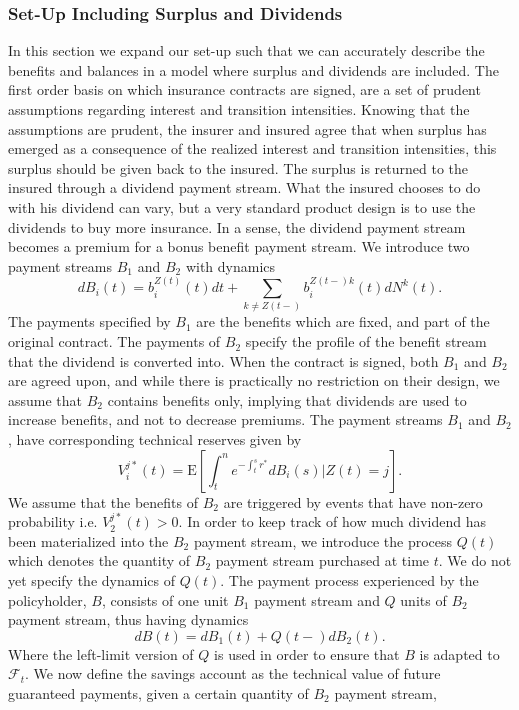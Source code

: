 \documentclass[12pt]{article}
\newcommand{\E}{\text{E}}
\theoremstyle{my_thm}
\begin{document}
\subsubsection{Set-Up Including Surplus and Dividends}
In this section we expand our set-up such that we can accurately describe the benefits and balances in a model where surplus and dividends are included. The first order basis on which insurance contracts are signed, are a set of prudent assumptions regarding interest and transition intensities. Knowing that the assumptions are prudent, the insurer and insured agree that when surplus has emerged as a consequence of the realized interest and transition intensities, this surplus should be given back to the insured. The surplus is returned to the insured through a dividend payment stream. What the insured chooses to do with his dividend can vary, but a very standard product design is to use the dividends to buy more insurance. In a sense, the dividend payment stream becomes a premium for a bonus benefit payment stream. We introduce two payment streams $B_1$ and $B_2$ with dynamics
$$
dB_i(t)=b_i^{Z(t)}(t) dt +\sum_{k \neq Z(t-)} b_i^{Z(t-)k}(t)dN^k(t).
$$
The payments specified by $B_1$ are the benefits which are fixed, and part of the original contract. The payments of $B_2$ specify the profile of the benefit stream that the dividend is converted into. When the contract is signed, both $B_1$ and $B_2$ are agreed upon, and while there is practically no restriction on their design, we assume that $B_2$ contains benefits only, implying that dividends are used to increase benefits, and not to decrease premiums. The payment streams $B_1$ and $B_2$, have corresponding technical reserves given by
$$
V_i^{j*}(t)=\E \left[ \int_t^n e^{-\int_t^s r^*} dB_i(s) \big| Z(t)=j \right].
$$
We assume that the benefits of $B_2$ are triggered by events that have non-zero probability i.e. $V_2^{j*}(t)>0$. In order to keep track of how much dividend has been materialized into the $B_2$ payment stream, we introduce the process $Q(t)$ which denotes the quantity of $B_2$ payment stream purchased at time $t$. We do not yet specify the dynamics of $Q(t)$. The payment process experienced by the policyholder, $B$, consists of one unit $B_1$ payment stream and $Q$ units of $B_2$ payment stream, thus having dynamics
$$
dB(t)=dB_1(t)+ Q(t-)dB_2(t).
$$
Where the left-limit version of $Q$ is used in order to ensure that $B$ is adapted to $\mathcal{F}_t$. We now define the savings account as the technical value of future guaranteed payments, given a certain quantity of $B_2$ payment stream,
\end{document}
